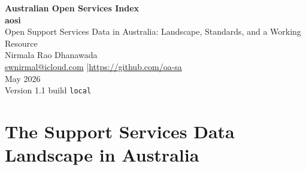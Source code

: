 \documentclass[11pt,a4paper]{article}
\newcommand{\docversion}{1.1}
\newcommand{\docbuild}{local}
\begin{document}
\begin{center}
{\LARGE\bfseries Australian Open Services Index}\\[0.2em]
{\large\textbf{aosi}}\\[0.4em]
{\large Open Support Services Data in Australia: Landscape, Standards, and a Working Resource}\\[1.5em]
{\normalsize Nirmala Rao Dhanawada}\\[0.3em]
{\small \href{mailto:swnirmal@icloud.com}{swnirmal@icloud.com} \quad|\quad \url{https://github.com/oa-sa}}\\[1.5em]
{\normalsize May 2026}\\[0.3em]
{\small\color{gray} Version \docversion{} \textbullet{} build \texttt{\docbuild}}
\end{center}

\vspace{1em}

\begin{abstract}
Australians looking for help with food, housing, health, legal aid, work, mental health, family violence, disability or aged care rely on a patchwork of directories. The biggest directories are freely accessible as services, but the underlying data is proprietary: there is no open licence, no bulk download, and no specification that lets another system exchange records with them. Government open-data portals publish pieces of the picture under different schemas. Community-contributed data fills a little more. No openly licensed, consolidated dataset covers this ground end to end. This paper maps the landscape, looks at what comparable systems have built in Scotland, the UK and North America, and introduces the Australian Open Services Index (aosi): an open pipeline that pulls 24,497 services from 27 public sources into a single standardised dataset, with a public web explorer and a native iOS app. The paper is honest about what automated aggregation can and cannot reach. It sets out the standards aosi follows (FAIR, CARE, the Human Services Data Specification) and the explicit carve-outs required for safety-sensitive services.
\end{abstract}


\section{The Support Services Data Landscape in Australia}
\end{document}

